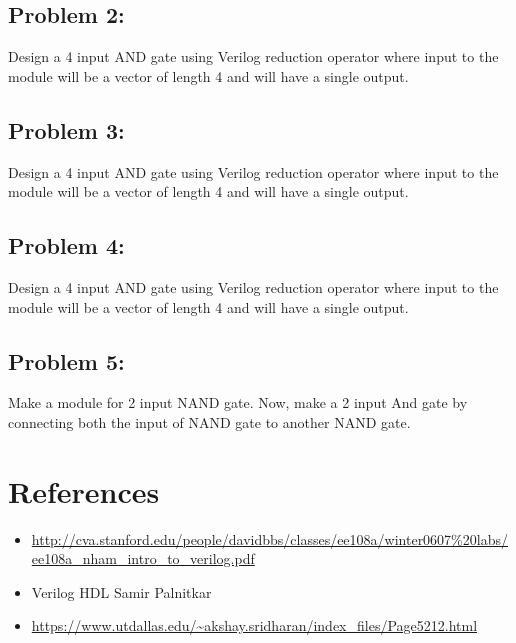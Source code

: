 \documentclass[a4paper,10pt]{article}
\theoremstyle{mytheor}
\begin{document}
\subsection*{Problem 2:}
Design a 4 input AND gate using Verilog reduction operator where input to the module will be a vector of length 4 and will have a single output.
\subsection*{Problem 3:}
Design a 4 input AND gate using Verilog reduction operator where input to the module will be a vector of length 4 and will have a single output.
\subsection*{Problem 4:}
Design a 4 input AND gate using Verilog reduction operator where input to the module will be a vector of length 4 and will have a single output.
\subsection*{Problem 5:}
Make a module for 2 input NAND gate. Now, make a 2 input And gate by connecting both the input of NAND gate to another NAND gate.


\section*{References}
\begin{itemize}
  \item \url{http://cva.stanford.edu/people/davidbbs/classes/ee108a/winter0607\%20labs/ee108a\_nham\_intro\_to\_verilog.pdf}
  \item Verilog HDL \- Samir Palnitkar
  \item \url{https://www.utdallas.edu/\~akshay.sridharan/index\_files/Page5212.html}
\end{itemize}
\end{document}
